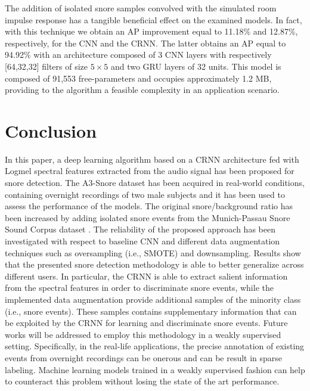 The addition of isolated snore samples convolved with the simulated room impulse response has a tangible beneficial effect on the examined models. In fact, with this technique we obtain an AP improvement equal to 11.18\% and 12.87\%, respectively, for the CNN and the CRNN. The latter obtains an AP equal to 94.92\% with an architecture composed of 3 CNN layers with respectively [64,32,32] filters of size $5\times5$ and two GRU layers of 32 units.
This model is composed of 91,553 free-parameters and occupies approximately 1.2 MB, providing to the algorithm a feasible complexity in an application scenario.


\section{Conclusion}
\label{sec:conclusion}
In this paper, a deep learning algorithm based on a CRNN architecture fed with Logmel spectral features extracted from the audio signal has been proposed for snore detection. The A3-Snore dataset has been acquired in real-world conditions, containing overnight recordings of two male subjects and it has been used to assess the performance of the models. The original snore/background ratio has been increased by adding isolated snore events from the Munich-Passau Snore Sound Corpus dataset \cite{ComParE2017}. The reliability of the proposed approach has been investigated with respect to baseline CNN and different data augmentation techniques such as oversampling (i.e., SMOTE) and downsampling. Results show that the presented snore detection methodology is able to better generalize across different users. In particular, the CRNN is able to extract salient information from the spectral features in order to discriminate snore events, while the implemented data augmentation provide additional samples of the minority class (i.e., snore events). These samples contains supplementary information that can be exploited by the CRNN for learning and discriminate snore events.
Future works will be addressed to employ this methodology in a weakly supervised setting.
Specifically, in the real-life applications, the precise annotation of existing events from overnight recordings can be onerous and can be result in sparse labeling. Machine learning models trained in a weakly supervised fashion can help to counteract this problem without losing the state of the art performance.


